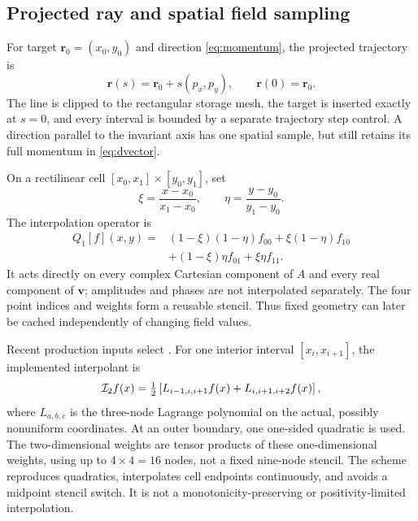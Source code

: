 \documentclass[11pt,a4paper]{article}
\newcommand{\code}[1]{\texttt{\detokenize{#1}}}
\begin{document}
\subsection{Projected ray and spatial field sampling}

For target $\bm r_0=(x_0,y_0)$ and direction \eqref{eq:momentum}, the projected
trajectory is
\begin{equation}
  \bm r(s)=\bm r_0+s(p_x,p_y),
  \qquad \bm r(0)=\bm r_0 .
  \label{eq:ray}
\end{equation}
The line is clipped to the rectangular storage mesh, the target is inserted
exactly at $s=0$, and every interval is bounded by a separate trajectory step
control.  A direction parallel to the invariant axis has one spatial sample,
but still retains its full momentum in \eqref{eq:dvector}.

On a rectilinear cell $[x_0,x_1]\times[y_0,y_1]$, set
\begin{equation}
  \xi=\frac{x-x_0}{x_1-x_0},\qquad
  \eta=\frac{y-y_0}{y_1-y_0}.
\end{equation}
The interpolation operator is
\begin{align}
  Q_1[f](x,y)={}&(1-\xi)(1-\eta)f_{00}
    +\xi(1-\eta)f_{10}\nonumber\\
    &+(1-\xi)\eta f_{01}+\xi\eta f_{11}.
  \label{eq:q1}
\end{align}
It acts directly on every complex Cartesian component of $A$ and every real
component of $\bm v$; amplitudes and phases are not interpolated separately.
The four point indices and weights form a reusable stencil.  Thus fixed
geometry can later be cached independently of changing field values.

Recent production inputs select \code{trajectory_interpolation_order=2}.
For one interior interval $[x_i,x_{i+1}]$, the implemented interpolant is
\begin{equation}
 {\cal I}_2 f(x)=\tfrac12\left[
 L_{i-1,i,i+1}f(x)+L_{i,i+1,i+2}f(x)\right],
 \label{eq:blendedquadratic}
\end{equation}
where $L_{a,b,c}$ is the three-node Lagrange polynomial on the actual,
possibly nonuniform coordinates. At an outer boundary, one one-sided
quadratic is used. The two-dimensional weights are tensor products of these
one-dimensional weights, using up to $4\times4=16$ nodes, not a fixed
nine-node stencil. The scheme reproduces quadratics, interpolates cell
endpoints continuously, and avoids a midpoint stencil switch. It is not a
monotonicity-preserving or positivity-limited interpolation.
\end{document}
